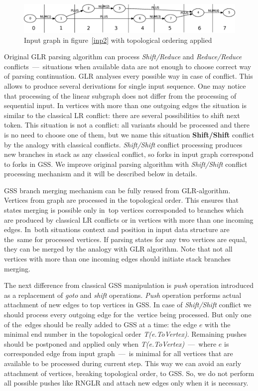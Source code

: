 \documentclass{sigplanconf}
\begin{document}
\begin{figure}[h!]
    \begin{center}
        \includegraphics[scale=0.25]{Graphs/toposort1.eps}
    \end{center}
    \caption{Input graph in figure~\ref{inp2} with topological ordering applied}
    \label{toposort}
\end{figure}

Original GLR parsing algorithm can process {\it Shift/Reduce} and {\it Reduce/Reduce} conflicts~---~situations when available data are not enough to choose correct way of parsing continuation. GLR analyses every possible way in case of conflict. This allows to produce several derivations for single input sequence. One may notice that processing of the linear subgraph does not differ from the processing of sequential input. In vertices with more than one outgoing edges the situation is similar to the classical LR conflict: there are several possibilities to shift next token. This situation is not a conflict: all variants should be processed and there is no need to choose one of them, but we name this situation {\bf Shift/Shift} conflict by the analogy with classical conflicts. {\it Shift/Shift} conflict processing produces new branches in stack as any classical conflict, so forks in input graph correspond to forks in GSS. We improve original parsing algorithm with {\it Shift/Shift} conflict processing mechanism and it will be described below in details. 

GSS branch merging mechanism can be fully reused from GLR-algorithm. Vertices from graph are processed in the topological order. This ensures that states merging is possible only in~top vertices corresponded to branches which are produced by classical LR conflicts or in vertices with more than one incoming edges. In~both situations context and position in input data structure are the~same for processed vertices. If parsing states for any two vertices are equal, they can be merged by the analogy with GLR algorithm. Note that not all vertices with more than one incoming edges should initiate stack branches merging. 

The next difference from classical GSS manipulation is {\it push} operation introduced as a replacement of {\it goto} and {\it shift} operations. {\it Push} operation performs actual attachment of new edges to top vertices in GSS. In case of {\it Shift/Shift} conflict we should process every outgoing edge for the~vertice being processed. But only one of the~edges should be really added to GSS at a time: the edge $e$ with the minimal end number in the topological order {\it T(e.ToVertex)}. Remaining pushes should be postponed and applied only when {\it T(e.ToVertex)}~---~where $e$ is corresponded edge from input graph~---~is minimal for all vertices that are available to be processed during current step. This way we can avoid an early attachment of vertices, breaking topological order, to GSS. So, we do not perform all possible pushes like RNGLR and attach new edges only when it is necessary. 
\end{document}
